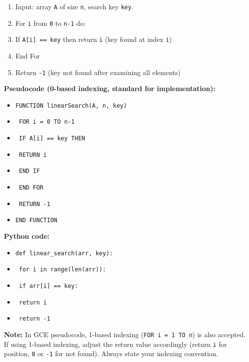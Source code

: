\documentclass[11pt]{article}
\begin{document}
\begin{methode}
\begin{enumerate}
    \item Input: array \texttt{A} of size \texttt{n}, search key \texttt{key}.
    \item For \texttt{i} from \texttt{0} to \texttt{n-1} do:
    \item \quad If \texttt{A[i] == key} then return \texttt{i}  \quad (key found at index \texttt{i})
    \item End For
    \item Return \texttt{-1}  \quad (key not found after examining all elements)
\end{enumerate}
\end{methode}

\begin{exemplebox}
\textbf{Pseudocode (0-based indexing, standard for implementation):}
\begin{itemize}
    \item \texttt{FUNCTION linearSearch(A, n, key)}
    \item \texttt{    FOR i = 0 TO n-1}
    \item \texttt{        IF A[i] == key THEN}
    \item \texttt{            RETURN i}
    \item \texttt{        END IF}
    \item \texttt{    END FOR}
    \item \texttt{    RETURN -1}
    \item \texttt{END FUNCTION}
\end{itemize}

\textbf{Python code:}
\begin{itemize}
    \item \texttt{def linear\_search(arr, key):}
    \item \texttt{    for i in range(len(arr)):}
    \item \texttt{        if arr[i] == key:}
    \item \texttt{            return i}
    \item \texttt{    return -1}
\end{itemize}

\textbf{Note:} In GCE pseudocode, 1-based indexing (\texttt{FOR i = 1 TO n}) is also accepted. If using 1-based indexing, adjust the return value accordingly (return \texttt{i} for position, \texttt{0} or \texttt{-1} for not found). Always state your indexing convention.
\end{exemplebox}
\end{document}

